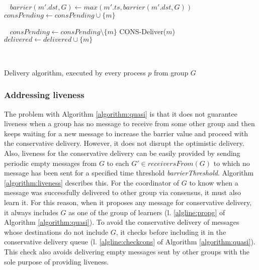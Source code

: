 \documentclass[times, 10pt]{article}
\begin{document}
\begin{algorithm}
\begin{distribalgo}[1]
\blankline\
  \STATE $barrier(m'.dst,G) \leftarrow max(m'.ts, barrier(m'.dst,G))$
  \IF {$m' \notin consPending \wedge m' \notin delivered$}
    \STATE $consPending \leftarrow consPending \cup \{m\}$
  \ENDIF
\ENDINDENT

\blankline\
  \STATE $consPending \leftarrow consPending \setminus \{m\}$
  \STATE CONS-Deliver($m$)
  \STATE $delivered \leftarrow delivered \cup \{m\}$

\blankline\
\ENDINDENT

\caption{Delivery algorithm, executed by every process $p$ from group $G$}
\label{algorithm:quasi}
\end{distribalgo}
\end{algorithm}

\subsubsection{Addressing liveness}

The problem with Algorithm \ref{algorithm:quasi} is that it does not guarantee liveness when a group has no message to receive from some other group and then keeps waiting for a new message to increase the barrier value and proceed with the conservative delivery. However, it does not disrupt the optimistic delivery. Also, liveness for the conservative delivery can be easily provided by sending periodic empty messages from $G$ to each $G' \in receiversFrom(G)$ to which no message has been sent for a specified time threshold \textit{barrierThreshold}. Algorithm \ref{algorithm:liveness} describes this. For the coordinator of $G$ to know when a message was successfully delivered to other group via consensus, it must also learn it. For this reason, when it proposes any message for conservative delivery, it always includes $G$ as one of the group of learners (l. \ref{algline:propg} of Algorithm \ref{algorithm:quasi}). To avoid the conservative delivery of messages whose destinations do not include $G$, it checks before including it in the conservative delivery queue (l. \ref{algline:checkcons} of Algorithm \ref{algorithm:quasi}). This check also avoids delivering empty messages sent by other groups with the sole purpose of providing liveness.
\end{document}
